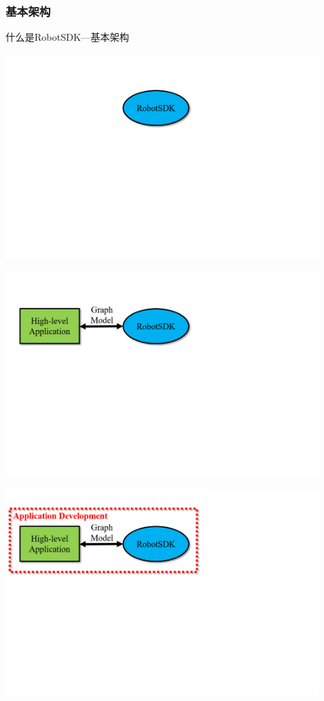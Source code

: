 \documentclass[9pt]{beamer}
\begin{document}
	\subsubsection{基本架构}
	\begin{frame}[allowframebreaks]{什么是RobotSDK---基本架构}
		\begin{center}
			\includegraphics[width=0.9\textwidth]{./img/frame1}
		\end{center}
		\begin{center}
			\includegraphics[width=0.9\textwidth]{./img/frame2}
		\end{center}
		\begin{center}
			\includegraphics[width=0.9\textwidth]{./img/frame3}

\end{center}
\end{frame}
\end{document}
